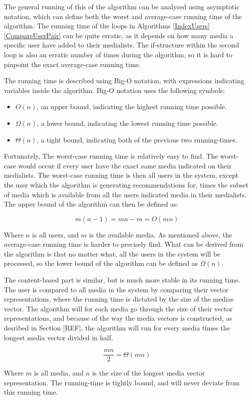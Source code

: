 The general running of this of the algorithm can be analysed using asymptotic notation, which can define both the worst and average-case running time of the algorithm. The running time of the loops in Algorithms \ref{IndexUsers} \ref{CompareUserPair} can be quite erratic, as it depends on how many media a specific user have added to their medialists. The if-structure within the second loop is also an erratic number of times during the algorithm, so it is hard to pinpoint the exact average-case running time.

The running time is described using Big-O notation, with expressions indicating variables inside the algorithm. Big-O notation uses the following symbols:
\begin{itemize}
	\item $O(n)$, an upper bound, indicating the highest running time possible.
	\item $\Omega(n)$, a lower bound, indicating the lowest running time possible.
	\item $\Theta(n)$, a tight bound, indicating both of the previous two running-times.
\end{itemize}

Fortunately, The worst-case running time is relatively easy to find. The worst-case would occur if every user have the exact same media indicated on their medialists. The worst-case running time is then all users in the system, except the user which the algorithm is generating recommendations for, times the subset of media which is available from all the users indicated media in their medialists. The upper bound of the algorithm can then be defined as:

\[
m(n-1) = mn - m = O(mn)
\]

Where $n$ is all users, and $m$ is the available media. As mentioned above, the average-case running time is harder to precisely find. What can be derived from the algorithm is that no matter what, all the users in the system will be processed, so the lower bound of the algorithm can be defined as $\Omega(n)$.

The content-based part is similar, but is much more stable in its running time. The user is compared to all media in the system by comparing their vector representations, where the running time is dictated by the size of the medias vector. The algorithm will for each media go through the size of their vector representations, and because of the way the media vectors is constructed, as desribed in Section [REF], the algorithm will run for every media times the longest media vector divided in half.

\[
\frac{mn}{2} = \Theta(mn)
\]

Where $m$ is all media, and $n$ is the size of the longest media vector representation. The running-time is tightly bound, and will never deviate from this running time.